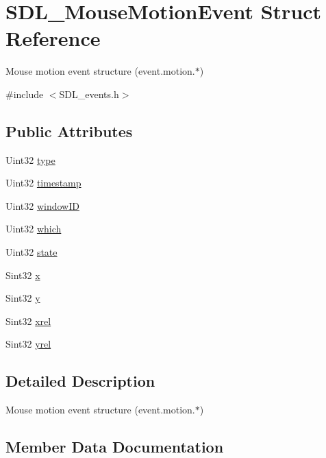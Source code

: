 \hypertarget{structSDL__MouseMotionEvent}{}\section{S\+D\+L\+\_\+\+Mouse\+Motion\+Event Struct Reference}
\label{structSDL__MouseMotionEvent}


Mouse motion event structure (event.\+motion.$\ast$)  




{\ttfamily \#include $<$S\+D\+L\+\_\+events.\+h$>$}

\subsection*{Public Attributes}
\begin{DoxyCompactItemize}
\item 
Uint32 \hyperlink{structSDL__MouseMotionEvent_a431dd28cd6db6a7335cf633dbeb80cfb}{type}
\item 
Uint32 \hyperlink{structSDL__MouseMotionEvent_af530bc0ef327ea6d497c5b1da119841c}{timestamp}
\item 
Uint32 \hyperlink{structSDL__MouseMotionEvent_aa9976725242ada93a9e18e7fdf5796e6}{window\+ID}
\item 
Uint32 \hyperlink{structSDL__MouseMotionEvent_a6f04c17b4305683915e2fd2dc3c36dbc}{which}
\item 
Uint32 \hyperlink{structSDL__MouseMotionEvent_a3f6e9bad9d959b824881ba09e05b7024}{state}
\item 
Sint32 \hyperlink{structSDL__MouseMotionEvent_a36398bb4a5308446a262b0bfc8baa80a}{x}
\item 
Sint32 \hyperlink{structSDL__MouseMotionEvent_a7e6a7b1f8713d1968dc913908e8ea448}{y}
\item 
Sint32 \hyperlink{structSDL__MouseMotionEvent_a1c01d9aba2a20778fb45a15dca39ef58}{xrel}
\item 
Sint32 \hyperlink{structSDL__MouseMotionEvent_a7674c8b92d039ab948f671a180fa7b30}{yrel}
\end{DoxyCompactItemize}


\subsection{Detailed Description}
Mouse motion event structure (event.\+motion.$\ast$) 

\subsection{Member Data Documentation}
\mbox{\label{structSDL__MouseMotionEvent_a3f6e9bad9d959b824881ba09e05b7024}} 
